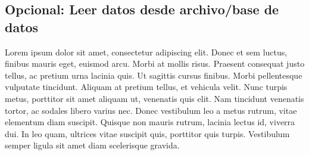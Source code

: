 \subsection*{Opcional: Leer datos desde archivo/base de datos}

Lorem ipsum dolor sit amet, consectetur adipiscing elit. Donec et sem luctus, finibus mauris eget, euismod arcu. Morbi at mollis risus. Praesent consequat justo tellus, ac pretium urna lacinia quis. Ut sagittis cursus finibus. Morbi pellentesque vulputate tincidunt. Aliquam at pretium tellus, et vehicula velit. Nunc turpis metus, porttitor sit amet aliquam ut, venenatis quis elit. Nam tincidunt venenatis tortor, ac sodales libero varius nec. Donec vestibulum leo a metus rutrum, vitae elementum diam suscipit. Quisque non mauris rutrum, lacinia lectus id, viverra dui. In leo quam, ultrices vitae suscipit quis, porttitor quis turpis. Vestibulum semper ligula sit amet diam scelerisque gravida.
